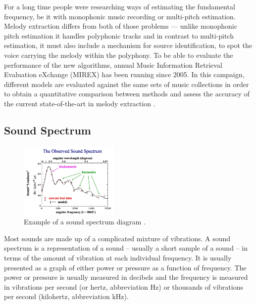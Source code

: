 For a long time people were researching ways of estimating the fundamental frequency, be it with monophonic music recording or multi-pitch estimation. Melody extraction differs from both of those problems — unlike monophonic pitch estimation it handles polyphonic tracks and in contrast to multi-pitch estimation, it must also include a mechanism for source identification, to spot the voice carrying the melody within the polyphony.
To be able to evaluate the performance of the new algorithms, annual Music Information Retrieval Evaluation eXchange (MIREX) has been running since 2005. In this campaign, different models are evaluated against the same sets of music collections in order to obtain a quantitative comparison between methods and assess the accuracy of the current state-of-the-art in melody extraction \cite{comparison}.

\vspace{10pt}

\subsection{Sound Spectrum}

\begin{figure}
  \vspace{-40pt}

  \begin{center}
    \includegraphics[width=0.43\textwidth]{Figures/soundspectrum}
  \end{center}
  \caption{Example of a sound spectrum diagram \cite{soundspectrum}.}
  \label{fig:DDR}
\end{figure}


Most sounds are made up of a complicated mixture of vibrations. A sound spectrum is a representation of a sound – usually a short sample of a sound – in terms of the amount of vibration at each individual frequency. It is usually presented as a graph of either power or pressure as a function of frequency. The power or pressure is usually measured in decibels and the frequency is measured in vibrations per second (or hertz, abbreviation Hz) or thousands of vibrations per second (kilohertz, abbreviation kHz). 

